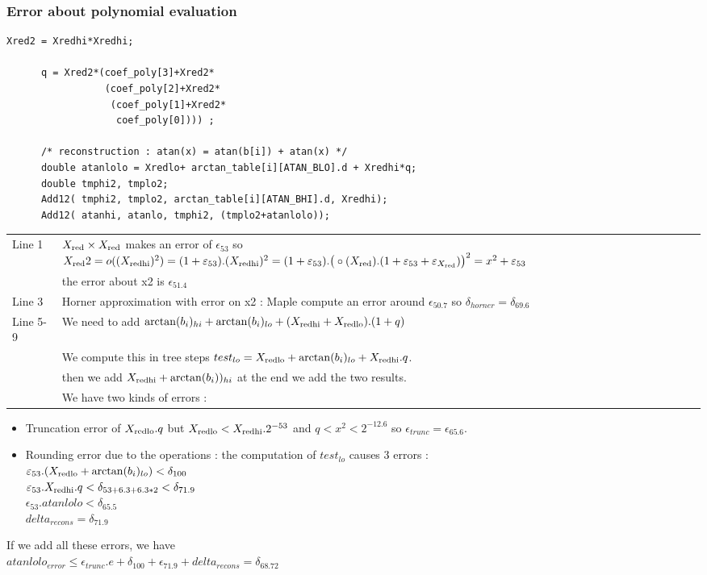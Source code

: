 \subsubsection{Error about polynomial evaluation}
\begin{lstlisting}[caption={Polynomial Evaluation},firstnumber=1]
      Xred2 = Xredhi*Xredhi;
      
      q = Xred2*(coef_poly[3]+Xred2*
                 (coef_poly[2]+Xred2*
                  (coef_poly[1]+Xred2*
                   coef_poly[0]))) ;

      /* reconstruction : atan(x) = atan(b[i]) + atan(x) */
      double atanlolo = Xredlo+ arctan_table[i][ATAN_BLO].d + Xredhi*q;
      double tmphi2, tmplo2;
      Add12( tmphi2, tmplo2, arctan_table[i][ATAN_BHI].d, Xredhi);
      Add12( atanhi, atanlo, tmphi2, (tmplo2+atanlolo));

\end{lstlisting}
\begin{tabular}{ll}
Line 1 & $X_{\mathrm{red}} \times X_{\mathrm{red}}$ makes an error of $\epsilon_{53}$ so $X_{\mathrm{red}}2 =
      o((X_{\mathrm{red hi}})^2) = (1+\varepsilon_{53}). (X_{\mathrm{red hi}})^2 = ( 1 + \varepsilon_{53}).\big(\circ(X_{\mathrm{red}}).(1+\varepsilon_{53}+\varepsilon_{X_{\mathrm{red}}})\big)^2 = x^2 +  \varepsilon_{53} $\\ 
      &the error about x2 is $\epsilon_{51.4}$ \\
Line 3 & Horner approximation with error on x2 :
      Maple compute an error around $\epsilon_{50.7}$ so $\delta_{horner}=\delta_{69.6}$\\ 
Line 5-9 & We need to add $\arctan(b_i)_{hi}+\arctan(b_i)_{lo} +
      (X_{\mathrm{red hi}}+X_{\mathrm{red lo}}).(1+q)$\\
      &
      We compute this in tree steps $test_{lo}= X_{\mathrm{red lo}}+ \arctan(b_i)_{lo}
      + X_{\mathrm{red hi}}.q$.\\
      & then we add $X_{\mathrm{red hi}}+\arctan(b_i))_{hi}$ at the end we add the two results.\\

      &We have two kinds of errors : 
\end{tabular}      
  \begin{itemize} 
    \item Truncation error of  $X_{\mathrm{red lo}}.q$
      but $X_{\mathrm{red lo}} < X_{\mathrm{red hi}}.2^{-53}$ and $q<x^2<2^{-12.6}$ so $\epsilon_{trunc} =
      \epsilon_{65.6}$. 
    \item Rounding error due to the operations : the computation of
      $test_{lo}$ causes 3 errors :\\
       $ \varepsilon_{53}.(X_{\mathrm{red lo}}+ \arctan(b_i)_{lo}) < \delta_{100}$\\
       $\varepsilon_{53}.X_{\mathrm{red hi}}.q < \delta_{53+6.3+6.3*2} < \delta_{71.9}$\\
       $ \epsilon_{53} . atanlolo < \delta_{65.5}$\\
       $delta_{recons} =  \delta_{71.9}$
      \end{itemize}
      If we add all these errors, we have \\
      $atanlolo_{error} \leq \epsilon_{trunc}.e + \delta_{100} +
      \epsilon_{71.9} + delta_{recons} = \delta_{68.72}$\\

